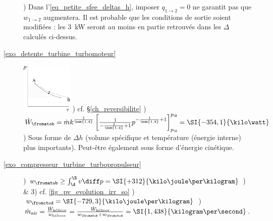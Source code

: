 \begin{description}
						) Dans l’\cref{eq_petite_sfee_deltas_h}, imposer $q_{1 \to 2} = 0$ ne garantit pas que $w_{1 \to 2}$ augmentera. Il est probable que les conditions de sortie soient modifiées : les \SI{3}{\kilo\watt} seront au moins en partie retrouvés dans les $\Delta$ calculés ci-dessus.
		\item [\ref{exo_detente_turbine_turbomoteur}]
						\includegraphics[width=2.5cm]{images/exo_pv_2.png}
						) cf. \S\ref{ch_reversibilite}
						) $\dot{W}_\fromatob = \dot m k^{\frac{1}{\num{1,4}}} \left[\frac{1}{-\frac{1}{\num{1,4}} +1} p^{-\frac{1}{\num{1,4}} +1}\right]_{p_\A}^{p_\B} = \SI{-354,1}{\kilo\watt}$
						) Sous forme de $\Delta h$ (volume spécifique et température (énergie interne) plus importants). Peut-être également sous forme d’énergie cinétique.
		\item [\ref{exo_compresseur_turbine_turbopropulseur}] 
						) $w_\fromatob \geq \int_\A^\B v \diff p = \SI{+312}{\kilo\joule\per\kilogram}$
						) \& 3) cf. \cref{fig_pv_evolution_irr_so}
						) $w_\fromctod = \SI{-729,3}{\kilo\joule\per\kilogram}$
						) $\dot{m}_\text{air} = \frac{\dot{W}_\text{hélices}}{w_\text{hélices}} = \frac{\dot{W}_\text{hélices}}{w_\fromatob + w_\fromctod} = \SI{1,438}{\kilogram\per\second}$.
	\end{description}
